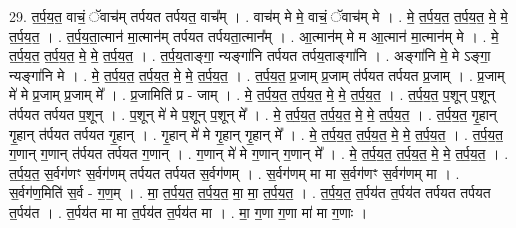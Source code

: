 \documentclass[17pt]{extarticle}
\begin{document}
29. त॒र्प॒य॒त॒ वाचं॒ ॅवाच॑म् तर्पयत तर्पयत॒ वाच᳚म् । . वाच॑म् मे मे॒ वाचं॒ ॅवाच॑म् मे । . मे॒ त॒र्प॒य॒त॒ त॒र्प॒य॒त॒ मे॒ मे॒ त॒र्प॒य॒त॒ । . त॒र्प॒य॒ता॒त्मान॑ मा॒त्मान॑म् तर्पयत तर्पयता॒त्मान᳚म् । . आ॒त्मान॑म् मे म आ॒त्मान॑ मा॒त्मान॑म् मे । . मे॒ त॒र्प॒य॒त॒ त॒र्प॒य॒त॒ मे॒ मे॒ त॒र्प॒य॒त॒ । . त॒र्प॒य॒ताङ्गा॒ न्यङ्गा॑नि तर्पयत तर्पय॒ताङ्गा॑नि । . अङ्गा॑नि मे॒ मे ऽङ्गा॒ न्यङ्गा॑नि मे । . मे॒ त॒र्प॒य॒त॒ त॒र्प॒य॒त॒ मे॒ मे॒ त॒र्प॒य॒त॒ । . त॒र्प॒य॒त॒ प्र॒जाम् प्र॒जाम् त॑र्पयत तर्पयत प्र॒जाम् । . प्र॒जाम् मे॑ मे प्र॒जाम् प्र॒जाम् मे᳚ । . प्र॒जामिति॑ प्र - जाम् । . मे॒ त॒र्प॒य॒त॒ त॒र्प॒य॒त॒ मे॒ मे॒ त॒र्प॒य॒त॒ । . त॒र्प॒य॒त॒ प॒शून् प॒शून् त॑र्पयत तर्पयत प॒शून् । . प॒शून् मे॑ मे प॒शून् प॒शून् मे᳚ । . मे॒ त॒र्प॒य॒त॒ त॒र्प॒य॒त॒ मे॒ मे॒ त॒र्प॒य॒त॒ । . त॒र्प॒य॒त॒ गृ॒हान् गृ॒हान् त॑र्पयत तर्पयत गृ॒हान् । . गृ॒हान् मे॑ मे गृ॒हान् गृ॒हान् मे᳚ । . मे॒ त॒र्प॒य॒त॒ त॒र्प॒य॒त॒ मे॒ मे॒ त॒र्प॒य॒त॒ । . त॒र्प॒य॒त॒ ग॒णान् ग॒णान् त॑र्पयत तर्पयत ग॒णान् । . ग॒णान् मे॑ मे ग॒णान् ग॒णान् मे᳚ । . मे॒ त॒र्प॒य॒त॒ त॒र्प॒य॒त॒ मे॒ मे॒ त॒र्प॒य॒त॒ । . त॒र्प॒य॒त॒ स॒र्वग॑णꣳ स॒र्वग॑णम् तर्पयत तर्पयत स॒र्वग॑णम् । . स॒र्वग॑णम् मा मा स॒र्वग॑णꣳ स॒र्वग॑णम् मा । . स॒र्वग॑ण॒मिति॑ स॒र्व - ग॒ण॒म् । . मा॒ त॒र्प॒य॒त॒ त॒र्प॒य॒त॒ मा॒ मा॒ त॒र्प॒य॒त॒ । . त॒र्प॒य॒त॒ त॒र्पय॑त त॒र्पय॑त तर्पयत तर्पयत त॒र्पय॑त । . त॒र्पय॑त मा मा त॒र्पय॑त त॒र्पय॑त मा । . मा॒ ग॒णा ग॒णा मा॑ मा ग॒णाः । \newline
\end{document}
